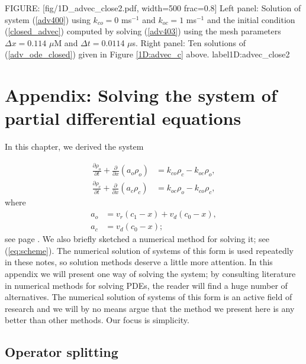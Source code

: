 FIGURE: [fig/1D_advec_close2.pdf, width=500 frac=0.8] Left panel: Solution of system (\ref{adv400})  using  $k_{co}=0$ ms$^{-1}$  and $k_{oc}=1$ ms$^{-1}$ and the initial condition (\ref{closed_advec}) computed by solving (\ref{adv403})  using the mesh parameters $\Delta x = 0.114$ $\mu$M and $\Delta t = 0.011$4 $\mu$s. Right panel: Ten solutions of (\ref{adv_ode_closed}) given in Figure \ref{1D:advec_c} above. \label{1D/compare_closed} label{1D:advec_close2}
\section[Appendix]{Appendix: Solving the system of partial differential
equations \label{appendix_hyp}}

In this chapter, we derived the system

\begin{align}
\frac{\partial\rho_{o}}{\partial t}+\frac{\partial}{\partial x}\left(
a_{o}\rho_{o}\right)   &  =k_{co}\rho_{c}-k_{oc}\rho_{o},\label{pdf400}\\
\frac{\partial\rho_{c}}{\partial t}+\frac{\partial}{\partial x}\left(
a_{c}\rho_{c}\right)   &  =k_{oc}\rho_{o}-k_{co}\rho_{c},\nonumber
\end{align}
where
\begin{align}
a_{o} &  =v_{r}(c_{1}-x)+v_{d}(c_{0}-x),\label{pdf401}\\
a_{c} &  =v_{d}(c_{0}-x);\nonumber
\end{align}
see page \pageref{system_def_99}. We also briefly sketched a numerical method for solving
it; see (\ref{eq:scheme}). The numerical solution of systems of this form is used repeatedly in these notes, so solution methods deserve a little more
attention. In this appendix we will present one way of solving the system; by consulting literature in numerical methods for solving PDEs, the reader will find a huge number of alternatives. The numerical solution of systems of this form is an active field of research and we will by no means argue that the method we present here is any better than other methods.  Our focus is simplicity.

\subsection{Operator splitting}

